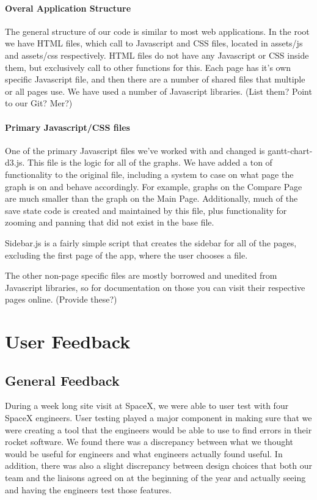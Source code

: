 \documentclass{hmcclinic}
\begin{document}
  \subsubsection{Overal Application Structure}

  The general structure of our code is similar to
  most web applications. In the root we have HTML files, which call to
  Javascript and CSS files, located in assets/js and assets/css respectively.
  HTML files do not have any Javascript or CSS inside them, but exclusively call
  to other functions for this. Each page has it's own specific Javascript file,
  and then there are a number of shared files that multiple or all pages use. We
  have used a number of Javascript libraries. (List them? Point to our Git?
  Mer?)

  \subsubsection{Primary Javascript/CSS files}
  One of the primary Javascript files we've worked
  with and changed is gantt-chart-d3.js. This file is the logic for all of the
  graphs. We have added a ton of functionality to the original file, including a
  system to case on what page the graph is on and behave accordingly. For
  example, graphs on the Compare Page are much smaller than the graph on the
  Main Page. Additionally, much of the save state code is created and maintained
  by this file, plus functionality for zooming and panning that did not exist in
  the base file.

  Sidebar.js is a fairly simple script that creates the sidebar for all of the
  pages, excluding the first page of the app, where the user chooses a file.

  The other non-page specific files are mostly borrowed and unedited from
  Javascript libraries, so for documentation on those you can visit their
  respective pages online. (Provide these?)

\chapter{User Feedback} %
\section{General Feedback} %
During a week long site visit at SpaceX, we were able to user test with four SpaceX engineers. User testing played a major component in making sure that we were creating a tool that the engineers would be able to use to find errors in their rocket software. We found there was a discrepancy between what we thought would be useful for engineers and what engineers actually found useful. In addition, there was also a slight discrepancy between design choices that both our team and the liaisons agreed on at the beginning of the year and actually seeing and having the engineers test those features.
\end{document}
